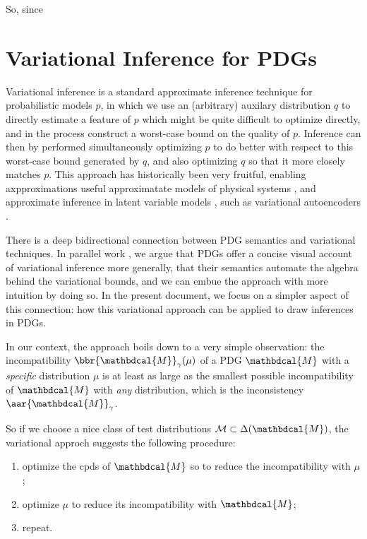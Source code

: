 \documentclass{article}
\theoremstyle{plain}
\theoremstyle{definition}
\theoremstyle{remark}
\newcommand{\dg}[1]{\mathbdcal{#1}}
\begin{document}
So, since 


\section{Variational Inference for PDGs}
	\label{sec:inference-from-variation}

Variational inference is a standard approximate inference technique for probabilistic models $p$, in which we use an (arbitrary) auxilary distribution $q$ to directly estimate a feature of $p$ which might be quite difficult to optimize directly, and in the process construct a worst-case bound on the quality of $p$.
Inference can then by performed simultaneously optimizing $p$ to do better with respect  to this worst-case bound generated by $q$, and also optimizing $q$ so that it more closely matches $p$.
This approach has historically been very fruitful, enabling axpproximations useful approximatate models of physical systems \cite{}, and approximate inference in latent variable models \cite{weight_uncertainty_nns}, such as variational autoencoders \cite{}.

There is a deep bidirectional connection between PDG semantics and variational techniques.
In parallel work \cite{PDG:universal_loss}, we argue that PDGs offer a concise visual account of variational inference more generally, that their semantics automate the algebra behind the variational bounds, and we can embue the approach with more intuition by doing so.
In the present document, we focus on a simpler aspect of this connection: how this variational approach can be applied to draw inferences in PDGs.

In our context, the approach boils down to a very simple observation: the incompatibility $\bbr{\dg M}_\gamma(\mu)$ of a PDG $\dg M$ with a \emph{specific} distribution $\mu$ is at least as large as the smallest possible incompatibility of $\dg M$ with \emph{any} distribution, which is the inconsistency $\aar{\dg M}_\gamma$.

So if we choose a nice class of test distributions $\mathcal M \subset \Delta(\dg M)$, the variational approch suggests the following procedure:
\begin{center}
	\begin{enumerate}[nosep]
		\item optimize the cpds of $\dg M$ so to reduce the incompatibility with $\mu$;
		\item optimize $\mu$ to reduce its incompatibility with $\dg M$;
		\item repeat.
	\end{enumerate}
\end{center}
\end{document}
